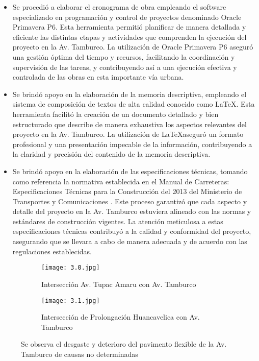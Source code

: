\begin{itemize}
	\item Se procedió a elaborar el cronograma de obra empleando el software especializado en programación y control de proyectos denominado Oracle Primavera P6. Esta herramienta permitió planificar de manera detallada y eficiente las distintas etapas y actividades que comprenden la ejecución del proyecto en la Av. Tamburco. La utilización de Oracle Primavera P6 aseguró una gestión óptima del tiempo y recursos, facilitando la coordinación y supervisión de las tareas, y contribuyendo así a una ejecución efectiva y controlada de las obras en esta importante vía urbana.
	\item Se brindó apoyo en la elaboración de la memoria descriptiva, empleando el sistema de composición de textos de alta calidad conocido como \LaTeX. Esta herramienta facilitó la creación de un documento detallado y bien estructurado que describe de manera exhaustiva los aspectos relevantes del proyecto en la Av. Tamburco. La utilización de \LaTeX aseguró un formato profesional y una presentación impecable de la información, contribuyendo a la claridad y precisión del contenido de la memoria descriptiva.
	\item Se brindó apoyo en la elaboración de las especificaciones técnicas, tomando como referencia la normativa establecida en el Manual de Carreteras: Especificaciones Técnicas para la Construcción del 2013 del Ministerio de Transportes y Comunicaciones \cite{MTC2013}. Este proceso garantizó que cada aspecto y detalle del proyecto en la Av. Tamburco estuviera alineado con las normas y estándares de construcción vigentes. La atención meticulosa a estas especificaciones técnicas contribuyó a la calidad y conformidad del proyecto, asegurando que se llevara a cabo de manera adecuada y de acuerdo con las regulaciones establecidas.
\end{itemize}

\begin{figure}[H]
	\begin{subfigure}{0.45\textwidth}
		\texttt{[image: 3.0.jpg]}
		\caption{Intersección Av. Tupac Amaru con Av. Tamburco}
		\label{fig:subfigura1}
	\end{subfigure}
	\hfill
	\begin{subfigure}{0.45\textwidth}
		\texttt{[image: 3.1.jpg]}
		\caption{Intersección de Prolongación Huancavelica con Av. Tamburco}
		\label{fig:subfigura2}
	\end{subfigure}
	\caption{Se observa el desgaste y deterioro del pavimento flexible de la Av. Tamburco de causas no determinadas}
	\label{fig:ta-ph}
\end{figure}


